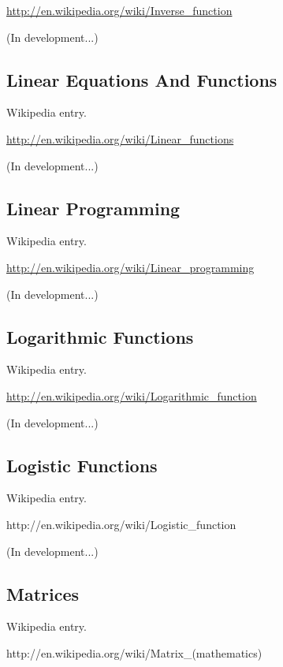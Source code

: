 \documentclass[12pt,oneside]{book}
\begin{document}
\href{http://en.wikipedia.org/wiki/Inverse_function}{http://en.wikipedia.org/wiki/Inverse\_function}

(In development...)

\subsection[Linear Equations And Functions]{Linear Equations And Functions}

Wikipedia entry.

\href{http://en.wikipedia.org/wiki/Linear_functions}{http://en.wikipedia.org/wiki/Linear\_functions}

(In development...)

\subsection[Linear Programming]{Linear Programming}

Wikipedia entry.

\href{http://en.wikipedia.org/wiki/Linear_programming}{http://en.wikipedia.org/wiki/Linear\_programming}

(In development...)

\subsection[Logarithmic Functions]{Logarithmic Functions}

Wikipedia entry.

\href{http://en.wikipedia.org/wiki/Logarithmic_function}{http://en.wikipedia.org/wiki/Logarithmic\_function}

(In development...)

\subsection[Logistic Functions]{Logistic Functions}

Wikipedia entry.

http://en.wikipedia.org/wiki/Logistic\_function

(In development...)

\subsection[Matrices]{Matrices}

Wikipedia entry.

http://en.wikipedia.org/wiki/Matrix\_(mathematics)
\end{document}

